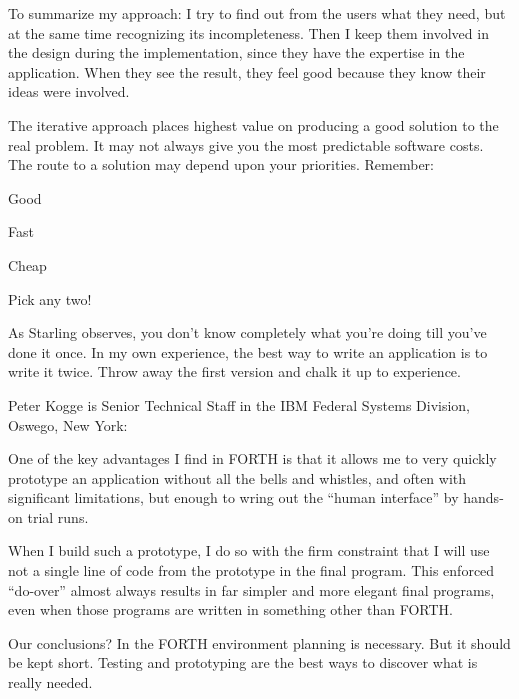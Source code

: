 \begin{tfquot}
To summarize my approach: I try to find out from the users what they
need, but at the same time recognizing its incompleteness. Then I keep
them involved in the design during the implementation, since they have the
expertise in the application.
When they see the result, they feel good because they know their ideas were
involved.

The iterative approach places highest value on producing a good solution to
the real problem. It may not always give you the most predictable software
costs. The route to a solution may depend upon your priorities. Remember:
\begin{list}{}{}
\item Good
\item Fast
\item Cheap
\end{list}
Pick any two!
\end{tfquot}
\blackline{2ex}

\noindent As Starling observes, you don't know completely what you're doing till
you've done it once. In my own experience, the best way to write an
application is to write it twice. Throw away the first version and chalk it up
to experience.

\bigskip\blackline{2ex}
\noindent Peter Kogge is Senior Technical Staff in the IBM Federal Systems
Division, Oswego, New York:

\begin{tfquot}
One of the key advantages I find in FORTH is that it allows
me to very quickly prototype an application without all the bells and
whistles, and often with significant limitations, but enough to wring
out the ``human interface'' by hands-on trial runs.

When I build such a prototype, I do so with the firm constraint that I
will use not a single line of code from the prototype in the final
program. This enforced ``do-over'' almost always results in far
simpler and more elegant final programs, even when those programs are
written in something other than FORTH.
\end{tfquot}
\blackline{2ex}

\noindent Our conclusions? In the FORTH environment planning is necessary. But
it should be kept short. Testing and prototyping are the best ways to
discover what is really needed.

